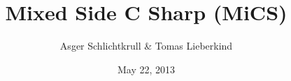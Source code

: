 \documentclass[12pt]{report}   						%
\begin{document}
\title{Mixed Side C Sharp (MiCS)}
\author{Asger Schlichtkrull \& Tomas Lieberkind}
\date{May 22, 2013}
\maketitle



\tableofcontents












\end{document}

